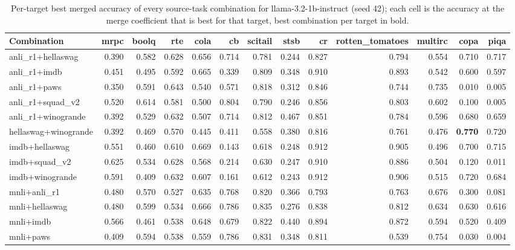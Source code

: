 \begin{table}[t]
  \centering
  \caption{Per-target best merged accuracy of every source-task combination for llama-3.2-1b-instruct (seed 42); each cell is the accuracy at the merge coefficient that is best for that target, best combination per target in bold.}
  \label{tab:target-transfer-full}
  \begin{tabular}{lrrrrrrrrrrrr}
    \toprule
    Combination & mrpc & boolq & rte & cola & cb & scitail & stsb & cr & rotten\_tomatoes & multirc & copa & piqa \\
    \midrule
    anli\_r1+hellaswag & 0.390 & 0.582 & 0.628 & 0.656 & 0.714 & 0.781 & 0.244 & 0.827 & 0.794 & 0.554 & 0.710 & 0.717 \\
    anli\_r1+imdb & 0.451 & 0.495 & 0.592 & 0.665 & 0.339 & 0.809 & 0.348 & 0.910 & 0.893 & 0.542 & 0.600 & 0.597 \\
    anli\_r1+paws & 0.350 & 0.591 & 0.643 & 0.540 & 0.571 & 0.818 & 0.312 & 0.846 & 0.744 & 0.735 & 0.010 & 0.005 \\
    anli\_r1+squad\_v2 & 0.520 & 0.614 & 0.581 & 0.500 & 0.804 & 0.790 & 0.246 & 0.856 & 0.803 & 0.602 & 0.100 & 0.005 \\
    anli\_r1+winogrande & 0.392 & 0.529 & 0.632 & 0.507 & 0.714 & 0.812 & 0.467 & 0.851 & 0.784 & 0.596 & 0.680 & 0.659 \\
    hellaswag+winogrande & 0.392 & 0.469 & 0.570 & 0.445 & 0.411 & 0.558 & 0.380 & 0.816 & 0.761 & 0.476 & \textbf{0.770} & 0.720 \\
    imdb+hellaswag & 0.551 & 0.460 & 0.610 & 0.669 & 0.143 & 0.618 & 0.248 & 0.912 & 0.905 & 0.496 & 0.700 & 0.715 \\
    imdb+squad\_v2 & 0.625 & 0.534 & 0.628 & 0.568 & 0.214 & 0.630 & 0.247 & 0.910 & 0.886 & 0.504 & 0.120 & 0.011 \\
    imdb+winogrande & 0.591 & 0.409 & 0.632 & 0.607 & 0.161 & 0.612 & 0.243 & 0.912 & 0.906 & 0.515 & 0.720 & 0.684 \\
    mnli+anli\_r1 & 0.480 & 0.570 & 0.527 & 0.635 & 0.768 & 0.820 & 0.366 & 0.793 & 0.763 & 0.676 & 0.300 & 0.081 \\
    mnli+hellaswag & 0.480 & 0.599 & 0.534 & 0.666 & 0.786 & 0.835 & 0.276 & 0.838 & 0.812 & 0.634 & 0.630 & 0.616 \\
    mnli+imdb & 0.566 & 0.461 & 0.538 & 0.648 & 0.679 & 0.822 & 0.440 & 0.894 & 0.872 & 0.594 & 0.520 & 0.409 \\
    mnli+paws & 0.409 & 0.594 & 0.538 & 0.559 & 0.786 & 0.831 & 0.348 & 0.811 & 0.539 & 0.754 & 0.030 & 0.004 \\

\end{tabular}
\end{table}
